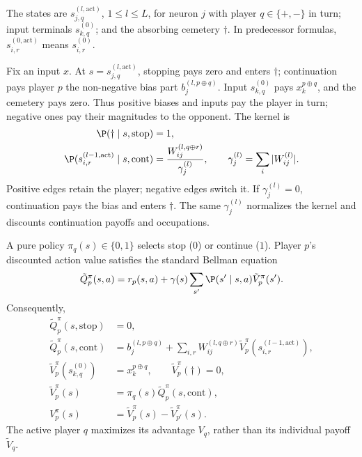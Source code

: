 \begin{definition}\label{ptnb:def:adf-game-states}
The states are $s_{j,q}^{(l,\mathrm{act})}$, $1\leq l\leq L$, for neuron $j$ with player
$q\in\{+,-\}$ in turn; input terminals $s_{k,q}^{(0)}$; and the absorbing cemetery $\dagger$.
In predecessor formulas, $s_{i,r}^{(0,\mathrm{act})}$ means $s_{i,r}^{(0)}$.
\end{definition}

\begin{definition}\label{ptnb:def:adf-recursion}
Fix an input $x$. At $s=s_{j,q}^{(l,\mathrm{act})}$, stopping pays zero and enters $\dagger$;
continuation pays player $p$ the non-negative bias part $b_j^{(l,p\oplus q)}$.
Input $s_{k,q}^{(0)}$ pays $x_k^{p\oplus q}$, and the cemetery pays zero. Thus positive biases and
inputs pay the player in turn; negative ones pay their magnitudes to the opponent.
The kernel is
\begin{align}
    \P(\dagger\mid s,\mathrm{stop})&=1,\label{ptnb:eq:adf-kernel-stop}\\
    \P(s_{i,r}^{(l-1,\mathrm{act})}\mid s,\mathrm{cont})
        &=\frac{W_{ij}^{(l,q\oplus r)}}{\gamma_j^{(l)}},
    \qquad \gamma_j^{(l)}=\sum_i|W_{ij}^{(l)}|.\label{ptnb:eq:adf-kernel}
\end{align}
Positive edges retain the player; negative edges switch it. If $\gamma_j^{(l)}=0$, continuation
pays the bias and enters $\dagger$. The same $\gamma_j^{(l)}$ normalizes the kernel and discounts
continuation payoffs and occupations.

A pure policy $\pi_q(s)\in\{0,1\}$ selects stop ($0$) or continue ($1$).
Player $p$'s discounted action value satisfies the standard Bellman equation
\begin{equation}\label{ptnb:eq:adf-q-bellman}
    \tilde Q_p^\pi(s,a)=r_p(s,a)+\gamma(s)\sum_{s'}\P(s'\mid s,a)\tilde V_p^\pi(s').
\end{equation}
Consequently,
\begin{align}
    \tilde Q_p^\pi(s,\mathrm{stop})&=0,\label{ptnb:eq:adf-q-stop}\\
    \tilde Q_p^\pi(s,\mathrm{cont})
        &=b_j^{(l,p\oplus q)}+\sum_{i,r}W_{ij}^{(l,q\oplus r)}
            \tilde V_p^\pi(s_{i,r}^{(l-1,\mathrm{act})}),\label{ptnb:eq:adf-q-cont}\\
    \tilde V_p^\pi(s_{k,q}^{(0)})&=x_k^{p\oplus q},
        \qquad \tilde V_p^\pi(\dagger)=0,\label{ptnb:eq:adf-v-terminal}\\
    \tilde V_p^\pi(s)&=\pi_q(s)\tilde Q_p^\pi(s,\mathrm{cont}),\label{ptnb:eq:adf-v-active}\\
    V_p^\pi(s)&=\tilde V_p^\pi(s)-\tilde V_{p'}^\pi(s).\label{ptnb:eq:adf-advantage}
\end{align}
The active player $q$ maximizes its advantage $V_q$, rather than its individual payoff $\tilde V_q$.
\end{definition}

